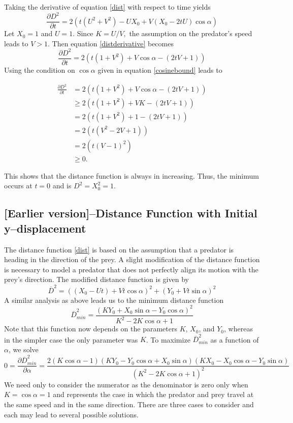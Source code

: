 \documentclass[12pt]{article}
\def\d{\partial}
\newcommand{\ol}{\overline}
\begin{document}
Taking the derivative of equation \eqref{dist} with respect to time yields
%
\begin{equation}
\frac{\d D^2}{\d t}  = 2(t(U^2+V^2) - UX_0 + V(X_0-2tU)\cos\alpha)
\label{distderivative}
\end{equation}  
%
Let $X_0=1$ and $U=1$. Since $K = U/V,$ the assumption on the predator's speed leads to $V > 1.$ 
Then equation \eqref{distderivative} becomes
%
\begin{equation}
\frac{\d D^2}{\d t}  = 2(t(1+V^2) +V\cos\alpha - (2tV + 1))
\label{distderivative2}
\end{equation}
%
Using the condition on $\cos\alpha$ given in equation \eqref{cosinebound} leads to

\begin{align*}
\frac{\d D^2}{\d t}  & = 2(t(1+V^2) +V\cos\alpha - (2tV + 1)) \\
& \geq 2(t(1+V^2) +VK - (2tV + 1)) \\
& = 2(t(1+V^2) +1 - (2tV + 1)) \\
& = 2(t(V^2- 2V + 1)) \\
& =2(t(V-1)^2)\\
& \geq 0.
\end{align*}

This shows that the distance function is always in increasing. Thus, the minimum occurs at $t=0$ and is $D^2 = X_0^2 = 1.$

\subsection{[Earlier version]--Distance Function with Initial y--displacement}
The distance function \eqref{dist} is based on the assumption that a predator is heading in the direction of the prey. A slight modification of the distance function is necessary to model a predator that does not perfectly align its motion with the prey's direction. The modified distance function is given by    
%
\begin{equation}
\ol D^2 = ((X_0 - Ut) + Vt\cos\alpha)^2 + (Y_0 + Vt\sin\alpha)^2
\label{y_dist}
\end{equation}
%
A similar analysis as above leads us to the minimum distance function
%
\begin{equation}
\ol D^2_{min}=\frac{(K Y_0+X_0 \sin \alpha -Y_0\cos \alpha)^2}{K^2-2 K \cos \alpha +1} 
\label{newDmin2}
\end{equation}
%
Note that this function now depends on the parameters $K$, $X_0$, and $Y_0$, whereas in the simpler case the only parameter was $K$. To maximize $\ol D^2_{min}$ as a function of $\alpha$, we solve
% 
\begin{equation}
0 = \frac{\d \ol D^2_{min}}{\d \alpha} = \frac{2(K \cos \alpha - 1)
	(K Y_0 - Y_0 \cos \alpha + X_0 \sin\alpha)(K X_0 - X_0 \cos \alpha - Y_0 \sin \alpha)}
	{(K^2 - 2K \cos \alpha + 1)^2}
\label{newDmin_dalpha}	
\end{equation}
%
We need only to consider the numerator as the denominator is zero only when $K = \cos \alpha = 1$ and represents the case in which the predator and prey travel at the same speed and in the same direction. There are three cases to consider and each may lead to several possible solutions.
% 
\end{document}
